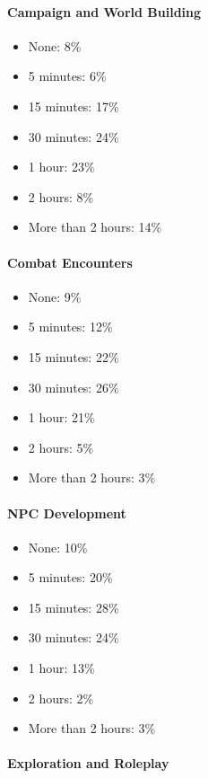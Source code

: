 \documentclass[10pt,a4paper,twoside,bg=print,twocolumn,openany,nodeprecatedcode]{dndbook}
\begin{document}
\paragraph{Campaign and World Building}

\begin{itemize}
\item None: 8\%
\item 5 minutes: 6\%
\item 15 minutes: 17\%
\item 30 minutes: 24\%
\item 1 hour: 23\%
\item 2 hours: 8\%
\item More than 2 hours: 14\%
\end{itemize}

\paragraph{Combat Encounters}

\begin{itemize}
\item None: 9\%
\item 5 minutes: 12\%
\item 15 minutes: 22\%
\item 30 minutes: 26\%
\item 1 hour: 21\%
\item 2 hours: 5\%
\item More than 2 hours: 3\%
\end{itemize}

\paragraph{NPC Development}

\begin{itemize}
\item None: 10\%
\item 5 minutes: 20\%
\item 15 minutes: 28\%
\item 30 minutes: 24\%
\item 1 hour: 13\%
\item 2 hours: 2\%
\item More than 2 hours: 3\%
\end{itemize}

\paragraph{Exploration and Roleplay}
\end{document}
